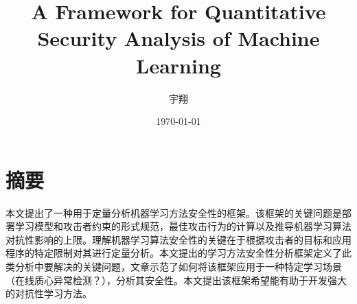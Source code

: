 \documentclass[UTF8]{ctexart}
\title{\heiti A Framework for Quantitative Security Analysis of Machine Learning}
\author{\kaishu 宇翔}
\date{\today}
\begin{document}
    
    \maketitle

    \clearpage
    \section{摘要}\label{sec:diyijie}
	本文提出了一种用于定量分析机器学习方法安全性的框架。该框架的关键问题是部署学习模型和攻击者约束的形式规范，最佳攻击行为的计算以及推导机器学习算法对抗性影响的上限。理解机器学习算法安全性的关键在于根据攻击者的目标和应用程序的特定限制对其进行定量分析。本文提出的学习方法安全性分析框架定义了此类分析中要解决的关键问题，文章示范了如何将该框架应用于一种特定学习场景（在线质心异常检测？），分析其安全性。本文提出该框架希望能有助于开发强大的对抗性学习方法。
	\clearpage
\end{document}
